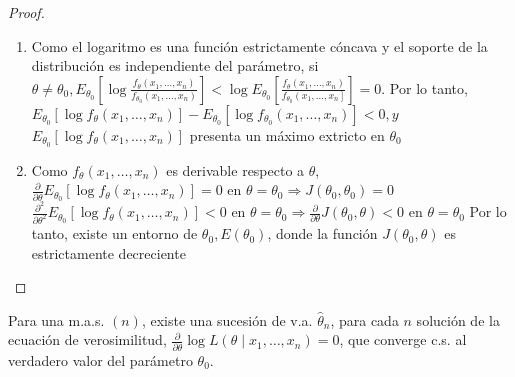 \begin{proof}
  \begin{enumerate}
    \item Como el logaritmo es una función estrictamente cóncava y el soporte de la
          distribución es independiente del parámetro, si $\theta \neq \theta_{0},
            E_{\theta_{0}}\left[\log \frac{f_{\theta}\left(x_{1}, \ldots,
                x_{n}\right)}{f_{\theta_{0}}\left(x_{1}, \ldots, x_{n}\right)}\right]<\log
            E_{\theta_{0}}\left[\frac{f_{\theta}\left(x_{1}, \ldots,
                x_{n}\right)}{f_{\theta_{0}}\left(x_{1}, \ldots, x_{n}\right]}\right]=0$. Por
          lo tanto,\\ $E_{\theta_{0}}\left[\log f_{\theta}\left(x_{1}, \ldots,
              x_{n}\right)\right]-E_{\theta_{0}}\left[\log f_{\theta_{0}}\left(x_{1}, \ldots,
              x_{n}\right)\right]<0, y$\\ $E_{\theta_{0}}\left[\log f_{\theta}\left(x_{1},
              \ldots, x_{n}\right)\right]$ presenta un máximo extricto en $\theta_{0}$
    \item Como $f_{\theta}\left(x_{1}, \ldots, x_{n}\right)$ es derivable respecto a
          $\theta$, $\frac{\partial}{\partial \theta} E_{\theta_{0}}\left[\log
              f_{\theta}\left(x_{1}, \ldots, x_{n}\right)\right]=0$ en $\theta=\theta_{0}
            \Rightarrow J\left(\theta_{0}, \theta_{0}\right)=0$
          $\frac{\partial^{2}}{\partial \theta^{2}} E_{\theta_{0}}\left[\log
              f_{\theta}\left(x_{1}, \ldots, x_{n}\right)\right]<0$ en $\theta=\theta_{0}
            \Rightarrow \frac{\partial}{\partial \theta} J\left(\theta_{0},
            \theta\right)<0$ en $\theta=\theta_{0}$ Por lo tanto, existe un entorno de
          $\theta_{0}, E\left(\theta_{0}\right)$, donde la función $J\left(\theta_{0},
            \theta\right)$ es estrictamente decreciente
  \end{enumerate}
\end{proof}

\begin{teorema} 
  Para una m.a.s. $(n)$, existe una sucesión de v.a. $\hat{\theta}_{n}$, para cada $n$ solución de la ecuación de verosimilitud, $\frac{\partial}{\partial \theta} \log L\left(\theta \mid x_{1}, \ldots, x_{n}\right)=0$, que converge c.s. al verdadero valor del parámetro $\theta_{0}$.
\end{teorema}

